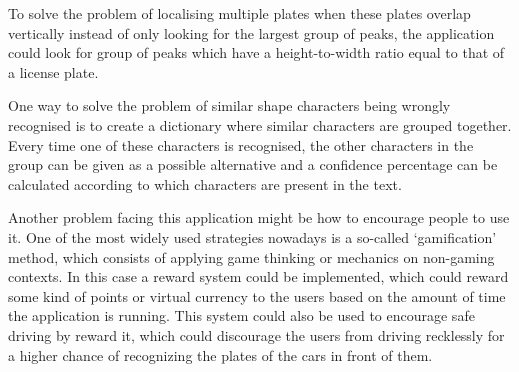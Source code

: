 
To solve the problem of localising multiple plates when these plates overlap vertically instead of only looking for the largest group of peaks, the application could look for group of peaks which have a height-to-width ratio equal to that of a license plate. 


One way to solve the problem of similar shape characters being wrongly recognised is to create a dictionary where similar characters are grouped together. Every time one of these characters is recognised, the other characters in the group can be given as a possible alternative and a confidence percentage can be calculated according to which characters are present in the text.


Another problem facing this application might be how to encourage people to use it. One of the most widely used strategies nowadays is a so-called `gamification' method, which consists of applying game thinking or mechanics on non-gaming contexts. In this case a reward system could be implemented, which could reward some kind of points or virtual currency to the users based on the amount of time the application is running. This system could also be used to encourage safe driving by reward it, which could discourage the users from driving recklessly for a higher chance of recognizing the plates of the cars in front of them.